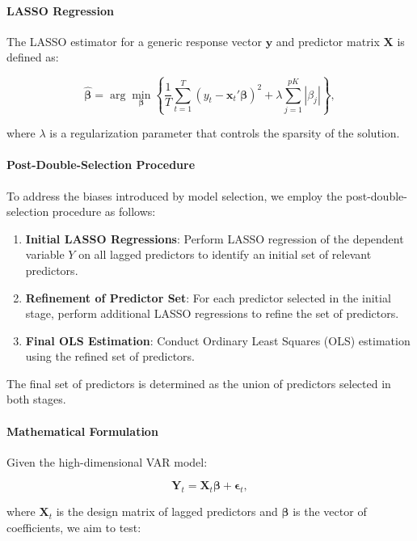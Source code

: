 \documentclass[12pt]{article}
\begin{document}
\paragraph{LASSO Regression}

The LASSO estimator for a generic response vector \(\mathbf{y}\) and predictor matrix \(\mathbf{X}\) is defined as:

\[
\hat{\boldsymbol{\beta}} = \arg\min_{\boldsymbol{\beta}} \left\{ \frac{1}{T} \sum_{t=1}^{T} (y_t - \mathbf{x}_t' \boldsymbol{\beta})^2 + \lambda \sum_{j=1}^{pK} |\beta_j| \right\},
\]

where \(\lambda\) is a regularization parameter that controls the sparsity of the solution.

\paragraph{Post-Double-Selection Procedure}

To address the biases introduced by model selection, we employ the post-double-selection procedure as follows:

\begin{enumerate}
    \item \textbf{Initial LASSO Regressions}: Perform LASSO regression of the dependent variable \(Y\) on all lagged predictors to identify an initial set of relevant predictors.
    \item \textbf{Refinement of Predictor Set}: For each predictor selected in the initial stage, perform additional LASSO regressions to refine the set of predictors.
    \item \textbf{Final OLS Estimation}: Conduct Ordinary Least Squares (OLS) estimation using the refined set of predictors.
\end{enumerate}

The final set of predictors is determined as the union of predictors selected in both stages.

\paragraph{Mathematical Formulation}

Given the high-dimensional VAR model:

\[
\mathbf{Y}_t = \mathbf{X}_t \boldsymbol{\beta} + \boldsymbol{\epsilon}_t,
\]

where \(\mathbf{X}_t\) is the design matrix of lagged predictors and \(\boldsymbol{\beta}\) is the vector of coefficients, we aim to test:
\end{document}
